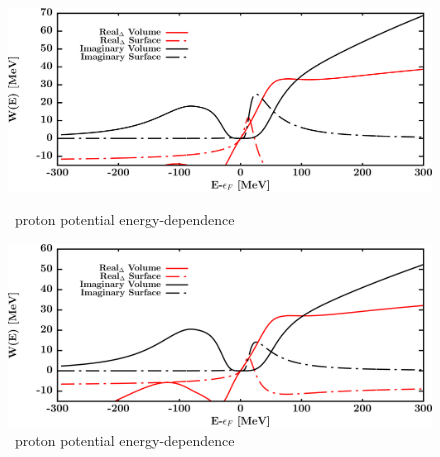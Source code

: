 \begin{figure}[H]
    \centering
    \begin{minipage}{0.45\textwidth}
        \centering
        \includegraphics[width=1.0\textwidth]{figures/pb208_protonPotentials.png}
        \caption{\pbEight\ proton potential energy-dependence}
        \label{DOMFitData_pb208_proton_potentialComponent_energy}
    \end{minipage}\hfill
    \begin{minipage}{0.45\textwidth}
        \centering
        \includegraphics[width=1.0\textwidth]{figures/pb208_neutronPotentials.png}
        \caption{\pbEight\ proton potential energy-dependence}
        \label{DOMFitData_pb208_neutron_potentialComponent_energy}
    \end{minipage}
\end{figure}

